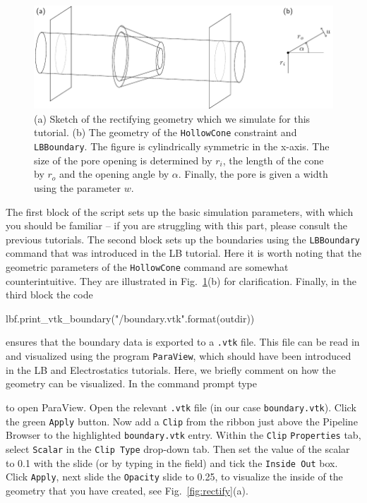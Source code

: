 \documentclass[aip,jcp,reprint,a4paper,onecolumn,amsmath]{revtex4-1}
\newcommand\code{\lstinline}
\newcommand\codees{\lstinline[language=python]}
\begin{document}
\begin{figure}[!htb]
\begin{center}
\includegraphics[scale=1.0]{FIGURES/geometry}
\end{center}
\caption{\label{fig:system}(a) Sketch of the rectifying geometry which we simulate for this tutorial. (b) The geometry of the \codees{HollowCone} constraint and \codees{LBBoundary}. The figure is cylindrically symmetric in the x-axis. The size of the pore opening is determined by $r_{i}$, the length of the cone by $r_{o}$ and the opening angle by $\alpha$. Finally, the pore is given a width using the parameter $w$.}
\end{figure}

The first block of the script sets up the basic simulation parameters, with which you should be familiar -- if you are struggling with this part, please consult the previous tutorials. The second block sets up the boundaries using the \codees{LBBoundary} command that was introduced in the LB tutorial. Here it is worth noting that the geometric parameters of the \codees{HollowCone} command are somewhat counterintuitive. They are illustrated in Fig.~\ref{fig:system}(b) for clarification. Finally, in the third block the code
\begin{espresso}
lbf.print_vtk_boundary("{}/boundary.vtk".format(outdir))
\end{espresso}
ensures that the boundary data is exported to a \codees{.vtk} file. This file can be read in and visualized using the program \code{ParaView}, which should have been introduced in the LB and Electrostatics tutorials. Here, we briefly comment on how the geometry can be visualized. In the command prompt type
to open ParaView. Open the relevant \code{.vtk} file (in our case \code{boundary.vtk}). Click the green \code{Apply} button. Now add a \code{Clip} from the ribbon just above the Pipeline Browser to the highlighted \code{boundary.vtk} entry. Within the \code{Clip} \code{Properties} tab, select \code{Scalar} in the \code{Clip Type} drop-down tab. Then set the value of the scalar to 0.1 with the slide (or by typing in the field) and tick the \code{Inside Out} box. Click \code{Apply}, next slide the \code{Opacity} slide to 0.25, to visualize the inside of the geometry that you have created, see Fig.~\ref{fig:rectify}(a).
\end{document}
